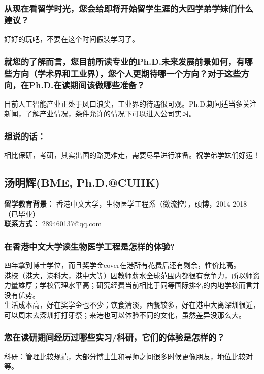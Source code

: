 \documentclass[a4paper,UTF8]{book}
\begin{document}
    \subsubsection*{从现在看留学时光，您会给即将开始留学生涯的大四学弟学妹们什么建议？}
    好好的玩吧，不要在这个时间假装学习了。
    
    \subsubsection*{就您的了解而言，您目前所读专业的Ph.D.未来发展前景如何，有哪些方向（学术界和工业界），您个人更期待哪一个方向？对于这些方向，在Ph.D.在读期间该做哪些准备？}
    目前人工智能产业正处于风口浪尖，工业界的待遇很可观。Ph.D.期间适当多关注新闻，了解产业情况，条件允许的情况下可以进入公司实习。

    \subsubsection{想说的话：}
    相比保研，考研，其实出国的路更难走，需要尽早进行准备。祝学弟学妹们好运！

        
        

   


\clearpage
\subsection{汤明辉(BME, Ph.D.@CUHK)}
    \textbf{留学教育背景：} 香港中文大学，生物医学工程系（微流控），硕博，2014-2018（已毕业）\\
    \textbf{联系方式：} 289460137@qq.com

    \subsubsection*{在香港中文大学读生物医学工程是怎样的体验?}
    四年拿到博士学位，而且奖学金cover在港所有花费后还有剩余，性价比高。\\
    港校（港大，港科大，港中大等）因教师薪水全球范围内都很有竞争力，所以师资力量雄厚；学校管理水平高；研究经费当前相比于同等国际排名的内地学校而言并没有优势。\\
    生活成本高，好在奖学金也不少；饮食清淡，西餐较多，好在港中大离深圳很近，可以周末去深圳打打牙祭；来港也可以体验不同的文化，虽然差异没那么大。

    \subsubsection*{您在读研期间经历过哪些实习/科研，它们的体验是怎样的？}
    科研：管理比较规范，大部分博士生和导师之间很多时候更像朋友，地位比较对等。
    
\end{document}
